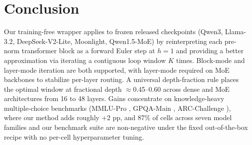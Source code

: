 \section{Conclusion}
\label{sec:conclusion}

Our training-free wrapper applies to frozen released checkpoints (Qwen3, Llama-3.2, DeepSeek-V2-Lite, Moonlight, Qwen1.5-MoE) by reinterpreting each pre-norm transformer block as a forward Euler step at $h{=}1$ and providing a better approximation via iterating a contiguous loop window $K$ times. Block-mode and layer-mode iteration are both supported, with layer-mode required on MoE backbones to stabilize per-layer routing. A universal depth-fraction rule places the optimal window at fractional depth $\approx$0.45--0.60 across dense and MoE architectures from 16 to 48 layers. Gains concentrate on knowledge-heavy multiple-choice benchmarks (MMLU-Pro \citep{wang2024mmlupro}, GPQA-Main \citep{rein2024gpqa}, ARC-Challenge \citep{clark2018arc}), where our method adds roughly +2 pp, and 87\% of cells across seven model families and our benchmark suite are non-negative under the fixed out-of-the-box recipe with no per-cell hyperparameter tuning.
